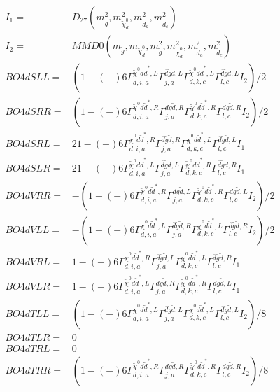 \documentclass[A4,landscape]{article}
\begin{document}
\begin{align} 
I_1 = & D_{27}(m^2_{\tilde{g}}, m^2_{\tilde{\chi}^0_{{d}}}, m^2_{\tilde{d}_{{a}}}, m^2_{\tilde{d}_{{c}}}) \\ 
I_2 = & MMD0(m_{\tilde{g}}, m_{\tilde{\chi}^0_{{d}}}, m^2_{\tilde{g}}, m^2_{\tilde{\chi}^0_{{d}}}, m^2_{\tilde{d}_{{a}}}, m^2_{\tilde{d}_{{c}}}) \\ 
  BO4dSLL= & (  1
-(-)
  6 \Gamma^{\tilde{\chi}^0 d \tilde{d}^*,L}_{d, i, a} \Gamma^{\bar{d}\tilde{g} \tilde{d} ,L}_{j, a} \Gamma^{\tilde{\chi}^0 d \tilde{d}^*,L}_{d, k, c} \Gamma^{\bar{d}\tilde{g} \tilde{d} ,L}_{l, c} I_2)/2 \\ 
  BO4dSRR= & (  1
-(-)
  6 \Gamma^{\tilde{\chi}^0 d \tilde{d}^*,R}_{d, i, a} \Gamma^{\bar{d}\tilde{g} \tilde{d} ,R}_{j, a} \Gamma^{\tilde{\chi}^0 d \tilde{d}^*,R}_{d, k, c} \Gamma^{\bar{d}\tilde{g} \tilde{d} ,R}_{l, c} I_2)/2 \\ 
  BO4dSRL= & 2   1
-(-)
  6 \Gamma^{\tilde{\chi}^0 d \tilde{d}^*,R}_{d, i, a} \Gamma^{\bar{d}\tilde{g} \tilde{d} ,R}_{j, a} \Gamma^{\tilde{\chi}^0 d \tilde{d}^*,L}_{d, k, c} \Gamma^{\bar{d}\tilde{g} \tilde{d} ,L}_{l, c} I_1 \\ 
  BO4dSLR= & 2   1
-(-)
  6 \Gamma^{\tilde{\chi}^0 d \tilde{d}^*,L}_{d, i, a} \Gamma^{\bar{d}\tilde{g} \tilde{d} ,L}_{j, a} \Gamma^{\tilde{\chi}^0 d \tilde{d}^*,R}_{d, k, c} \Gamma^{\bar{d}\tilde{g} \tilde{d} ,R}_{l, c} I_1 \\ 
  BO4dVRR= & -(  1
-(-)
  6 \Gamma^{\tilde{\chi}^0 d \tilde{d}^*,R}_{d, i, a} \Gamma^{\bar{d}\tilde{g} \tilde{d} ,L}_{j, a} \Gamma^{\tilde{\chi}^0 d \tilde{d}^*,R}_{d, k, c} \Gamma^{\bar{d}\tilde{g} \tilde{d} ,L}_{l, c} I_2)/2 \\ 
  BO4dVLL= & -(  1
-(-)
  6 \Gamma^{\tilde{\chi}^0 d \tilde{d}^*,L}_{d, i, a} \Gamma^{\bar{d}\tilde{g} \tilde{d} ,R}_{j, a} \Gamma^{\tilde{\chi}^0 d \tilde{d}^*,L}_{d, k, c} \Gamma^{\bar{d}\tilde{g} \tilde{d} ,R}_{l, c} I_2)/2 \\ 
  BO4dVRL= &   1
-(-)
  6 \Gamma^{\tilde{\chi}^0 d \tilde{d}^*,R}_{d, i, a} \Gamma^{\bar{d}\tilde{g} \tilde{d} ,L}_{j, a} \Gamma^{\tilde{\chi}^0 d \tilde{d}^*,L}_{d, k, c} \Gamma^{\bar{d}\tilde{g} \tilde{d} ,R}_{l, c} I_1 \\ 
  BO4dVLR= &   1
-(-)
  6 \Gamma^{\tilde{\chi}^0 d \tilde{d}^*,L}_{d, i, a} \Gamma^{\bar{d}\tilde{g} \tilde{d} ,R}_{j, a} \Gamma^{\tilde{\chi}^0 d \tilde{d}^*,R}_{d, k, c} \Gamma^{\bar{d}\tilde{g} \tilde{d} ,L}_{l, c} I_1 \\ 
  BO4dTLL= & (  1
-(-)
  6 \Gamma^{\tilde{\chi}^0 d \tilde{d}^*,L}_{d, i, a} \Gamma^{\bar{d}\tilde{g} \tilde{d} ,L}_{j, a} \Gamma^{\tilde{\chi}^0 d \tilde{d}^*,L}_{d, k, c} \Gamma^{\bar{d}\tilde{g} \tilde{d} ,L}_{l, c} I_2)/8 \\ 
  BO4dTLR= & 0 \\ 
  BO4dTRL= & 0 \\ 
  BO4dTRR= & (  1
-(-)
  6 \Gamma^{\tilde{\chi}^0 d \tilde{d}^*,R}_{d, i, a} \Gamma^{\bar{d}\tilde{g} \tilde{d} ,R}_{j, a} \Gamma^{\tilde{\chi}^0 d \tilde{d}^*,R}_{d, k, c} \Gamma^{\bar{d}\tilde{g} \tilde{d} ,R}_{l, c} I_2)/8 \\ 
\end{align} 
\end{document}
